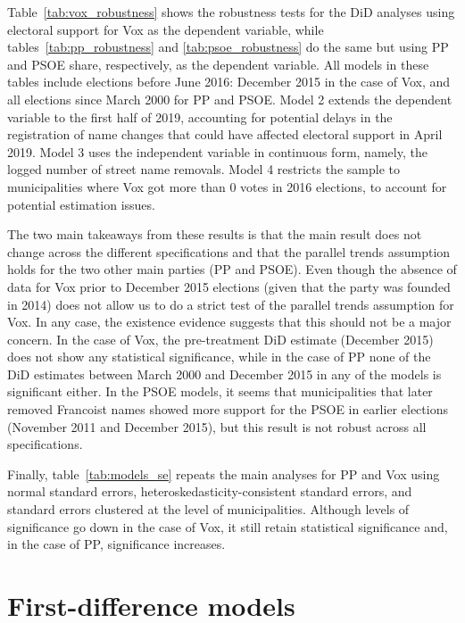 \documentclass[12pt, titlepage]{article}
\begin{document}
Table~\ref{tab:vox_robustness} shows the robustness tests for the DiD analyses using electoral support for Vox as the dependent variable, while tables~\ref{tab:pp_robustness} and \ref{tab:psoe_robustness} do the same but using PP and PSOE share, respectively, as the dependent variable.
All models in these tables include elections before June 2016: December 2015 in the case of Vox, and all elections since March 2000 for PP and PSOE.
Model 2 extends the dependent variable to the first half of 2019, accounting for potential delays in the registration of name changes that could have affected electoral support in April 2019.
Model 3 uses the independent variable in continuous form, namely, the logged number of street name removals.
Model 4 restricts the sample to municipalities where Vox got more than 0 votes in 2016 elections, to account for potential estimation issues.

The two main takeaways from these results is that the main result does not change across the different specifications and that the parallel trends assumption holds for the two other main parties (PP and PSOE).
Even though the absence of data for Vox prior to December 2015 elections (given that the party was founded in 2014) does not allow us to do a strict test of the parallel trends assumption for Vox.
In any case, the existence evidence suggests that this should not be a major concern.
In the case of Vox, the pre-treatment DiD estimate (December 2015) does not show any statistical significance, while in the case of PP none of the DiD estimates between March 2000 and December 2015 in any of the models is significant either.
In the PSOE models, it seems that municipalities that later removed Francoist names showed more support for the PSOE in earlier elections (November 2011 and December 2015), but this result is not robust across all specifications.

Finally, table~\ref{tab:models_se} repeats the main analyses for PP and Vox using normal standard errors, heteroskedasticity-consistent standard errors, and standard errors clustered at the level of municipalities.
Although levels of significance go down in the case of Vox, it still retain statistical significance and, in the case of PP, significance increases.







\clearpage
\section{First-difference models}\label{app:first_diff}
\end{document}
